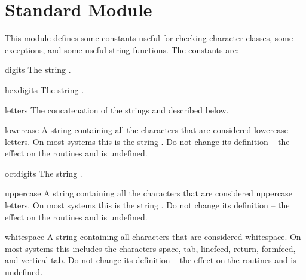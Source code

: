 \section{Standard Module }


This module defines some constants useful for checking character
classes, some exceptions, and some useful string functions.
The constants are:

\renewcommand{\indexsubitem}{(data in module string)}
\begin{datadesc}{digits}
  The string .
\end{datadesc}

\begin{datadesc}{hexdigits}
  The string .
\end{datadesc}

\begin{datadesc}{letters}
  The concatenation of the strings  and
   described below.
\end{datadesc}

\begin{datadesc}{lowercase}
  A string containing all the characters that are considered lowercase
  letters.  On most systems this is the string
  .  Do not change its definition --
  the effect on the routines  and  is
  undefined.
\end{datadesc}

\begin{datadesc}{octdigits}
  The string .
\end{datadesc}

\begin{datadesc}{uppercase}
  A string containing all the characters that are considered uppercase
  letters.  On most systems this is the string
  .  Do not change its definition --
  the effect on the routines  and  is
  undefined.
\end{datadesc}

\begin{datadesc}{whitespace}
  A string containing all characters that are considered whitespace.
  On most systems this includes the characters space, tab, linefeed,
  return, formfeed, and vertical tab.  Do not change its definition --
  the effect on the routines  and  is
  undefined.
\end{datadesc}

